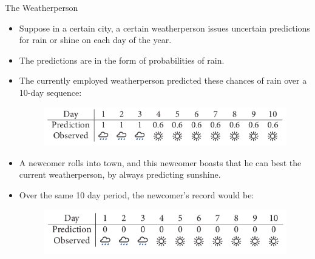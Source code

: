 \documentclass[handout]{beamer}
\begin{document}
\begin{frame}{The Weatherperson}
\scriptsize{

\begin{itemize}
\item Suppose in a certain city, a certain weatherperson issues uncertain predictions for rain or shine on each day of the year.

\item The predictions are in the form of probabilities of rain. 

\item The currently employed weatherperson predicted these chances of rain over a 10-day sequence: 

\begin{figure}[h!]
	\centering
	\includegraphics[scale=0.41]{pics/weather1.png}
\end{figure}


\item A newcomer rolls into town, and this newcomer boasts that he can best the current weatherperson, by always predicting sunshine. 

\item Over the same 10 day period, the newcomer's record would be:

\begin{figure}[h!]
	\centering
	\includegraphics[scale=0.41]{pics/weather2.png}
\end{figure}


\end{itemize}


} 
\end{frame}
\end{document}
